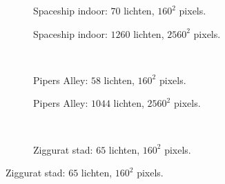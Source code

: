 \begin{figure}[p]
  \begin{adjustbox}{minipage=\textwidth, scale=0.6}
    \begin{subfigure}[b]{0.83\textwidth}
      \centering
      \def\svgwidth{\textwidth}
      
      \caption{Spaceship indoor: $70$ lichten, $160^2$ pixels.}
      \label{fig:fds-test-frames:indoor-low}
    \end{subfigure}
  \end{adjustbox} %
  \begin{adjustbox}{minipage=\textwidth, scale=0.6}
    \begin{subfigure}[b]{0.83\textwidth}
      \centering
      \def\svgwidth{\textwidth}
      
      \caption{Spaceship indoor: $1260$ lichten, $2560^2$ pixels.}
      \label{fig:fds-test-frames:indoor-high}
    \end{subfigure}
  \end{adjustbox} \\
  \begin{adjustbox}{minipage=\textwidth, scale=0.6}
    \begin{subfigure}[b]{0.83\textwidth}
      \centering
      \def\svgwidth{\textwidth}
      
      \caption{Pipers Alley: $58$ lichten, $160^2$ pixels.}
      \label{fig:fds-test-frames:alley-low}
    \end{subfigure}
  \end{adjustbox} %
  \begin{adjustbox}{minipage=\textwidth, scale=0.6}
    \begin{subfigure}[b]{0.83\textwidth}
      \centering
      \def\svgwidth{\textwidth}
      
      \caption{Pipers Alley: $1044$ lichten, $2560^2$ pixels.}
      \label{fig:fds-test-frames:alley-high}
    \end{subfigure}
  \end{adjustbox} \\
  \begin{adjustbox}{minipage=\textwidth, scale=0.6}
    \begin{subfigure}[b]{0.83\textwidth}
      \centering
      \def\svgwidth{\textwidth}
      
      \caption{Ziggurat stad: $65$ lichten, $160^2$ pixels.}

\end{subfigure}
\end{adjustbox}
\end{figure}
